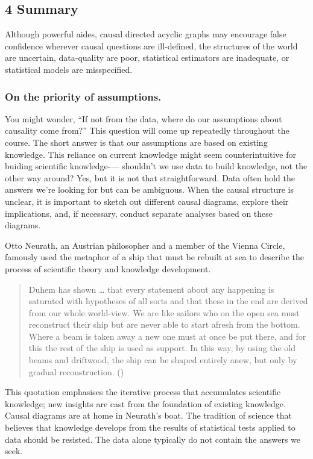 \documentclass[
  single column]{article}
\begin{document}
\subsection{4 Summary}\label{summary}

Although powerful aides, causal directed acyclic graphs may encourage
false confidence wherever causal questions are ill-defined, the
structures of the world are uncertain, data-quality are poor,
statistical estimators are inadequate, or statistical models are
misspecified.

\subsubsection{On the priority of
assumptions.}\label{on-the-priority-of-assumptions.}

You might wonder, ``If not from the data, where do our assumptions about
causality come from?'' This question will come up repeatedly throughout
the course. The short answer is that our assumptions are based on
existing knowledge. This reliance on current knowledge might seem
counterintuitive for buiding scientific knowledge-\/--- shouldn't we use
data to build knowledge, not the other way around? Yes, but it is not
that straightforward. Data often hold the answers we're looking for but
can be ambiguous. When the causal structure is unclear, it is important
to sketch out different causal diagrams, explore their implications,
and, if necessary, conduct separate analyses based on these diagrams.

Otto Neurath, an Austrian philosopher and a member of the Vienna Circle,
famously used the metaphor of a ship that must be rebuilt at sea to
describe the process of scientific theory and knowledge development.

\begin{quote}
Duhem has shown \ldots{} that every statement about any happening is
saturated with hypotheses of all sorts and that these in the end are
derived from our whole world-view. We are like sailors who on the open
sea must reconstruct their ship but are never able to start afresh from
the bottom. Where a beam is taken away a new one must at once be put
there, and for this the rest of the ship is used as support. In this
way, by using the old beams and driftwood, the ship can be shaped
entirely anew, but only by gradual reconstruction.
()
\end{quote}

This quotation emphasises the iterative process that accumulates
scientific knowledge; new insights are cast from the foundation of
existing knowledge. Causal diagrams are at home in Neurath's boat. The
tradition of science that believes that knowledge develops from the
results of statistical tests applied to data should be resisted. The
data alone typically do not contain the answers we seek.
\end{document}
